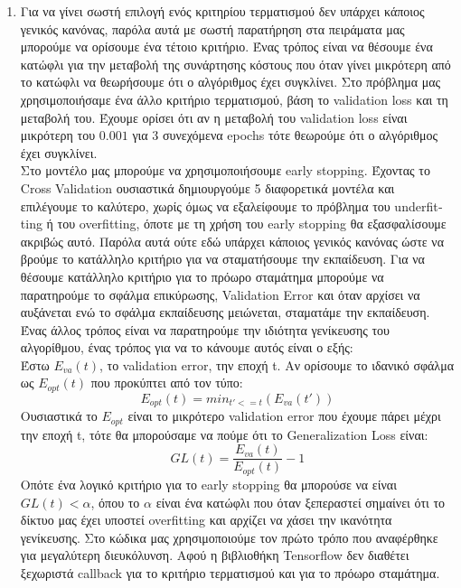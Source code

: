 \documentclass[12pt,a4paper]{article}
\newcommand{\tl}{\textlatin}
\begin{document}
\begin{enumerate}[a]
        \item Για να γίνει σωστή επιλογή ενός κριτηρίου τερματισμού δεν υπάρχει κάποιος γενικός κανόνας, παρόλα αυτά με σωστή παρατήρηση στα πειράματα μας μπορούμε να ορίσουμε ένα τέτοιο κριτήριο. Ένας τρόπος είναι να θέσουμε ένα κατώφλι για την μεταβολή της συνάρτησης κόστους που όταν γίνει μικρότερη από το κατώφλι να θεωρήσουμε ότι ο αλγόριθμος έχει συγκλίνει. Στο πρόβλημα μας χρησιμοποιήσαμε ένα άλλο κριτήριο τερματισμού, βάση το \tl{validation loss}   και τη μεταβολή του. Έχουμε ορίσει ότι αν η μεταβολή του \tl{validation loss} είναι μικρότερη του $0.001$ για 3 συνεχόμενα \tl{epochs} τότε θεωρούμε ότι ο αλγόριθμος έχει συγκλίνει. \\ 
        Στο μοντέλο μας μπορούμε να χρησιμοποιήσουμε \tl{early stopping}. Έχοντας το \tl{Cross Validation} ουσιαστικά δημιουργούμε 5 διαφορετικά μοντέλα και επιλέγουμε το καλύτερο, χωρίς όμως να εξαλείφουμε το πρόβλημα του \tl{underfitting} ή του \tl{overfitting}, όποτε με τη χρήση του \tl{early stopping} θα εξασφαλίσουμε ακριβώς αυτό. Παρόλα αυτά ούτε εδώ υπάρχει κάποιος γενικός κανόνας ώστε να βρούμε το κατάλληλο κριτήριο για να σταματήσουμε την εκπαίδευση. Για να θέσουμε κατάλληλο κριτήριο για το πρόωρο σταμάτημα μπορούμε να παρατηρούμε το σφάλμα επικύρωσης, \tl{Validation Error} και όταν αρχίσει να αυξάνεται ενώ το σφάλμα εκπαίδευσης μειώνεται, σταματάμε την εκπαίδευση. Ένας άλλος τρόπος είναι
        να παρατηρούμε την ιδιότητα γενίκευσης του αλγορίθμου, ένας τρόπος για να το κάνουμε αυτός είναι ο εξής: \\ 
        Έστω \tl{$E_{va}(t)$}, το \tl{validation error}, την εποχή \tl{t}. 
        Αν ορίσουμε το ιδανικό σφάλμα ως \tl{$E_{opt}(t)$} που προκύπτει από τον τύπο:
        \begin{equation}
           E_{opt}(t) = min_{t'<=t}(E_{va}(t'))
        \end{equation}
        Ουσιαστικά το \tl{$E_{opt}$} είναι το μικρότερο \tl{validation error} που έχουμε πάρει μέχρι την εποχή \tl{t}, τότε θα μπορούσαμε να πούμε ότι το \tl{Generalization Loss} είναι:
        \begin{equation}
           GL(t)=\frac{E_{va}(t)}{E_{opt}(t)} - 1
        \end{equation}
        Οπότε ένα λογικό κριτήριο για το \tl{early stopping} θα μπορούσε να είναι \tl{$GL(t) < \alpha$}, όπου το $\alpha$ είναι ένα κατώφλι που όταν ξεπεραστεί σημαίνει ότι το δίκτυο μας έχει υποστεί \tl{overfitting} και αρχίζει να χάσει την ικανότητα γενίκευσης. 
        Στο κώδικα μας χρησιμοποιούμε τον πρώτο τρόπο που αναφέρθηκε για μεγαλύτερη διευκόλυνση. Αφού η βιβλιοθήκη \tl{Tensorflow} δεν διαθέτει ξεχωριστά \tl{callback} για το κριτήριο τερματισμού και για το πρόωρο σταμάτημα.

    \end{enumerate}
\end{document}
